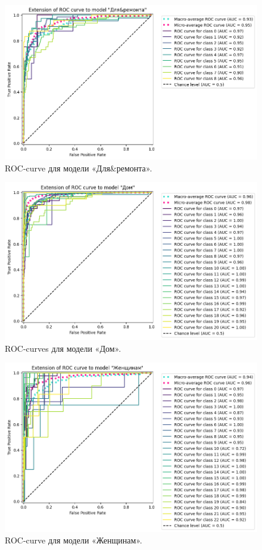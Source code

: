 \documentclass[a4paper,12pt]{extarticle}
\begin{document}
\begin{figure}[hbtp]
	\centering
	\includegraphics[scale=0.7]{roc_curves/roccurve_Для&ремонта.png}
	\caption{ROC-curve для модели «Для\&ремонта».}
	\label{fig:roccurve_Для&ремонта}
\end{figure}

\begin{figure}[hbtp]
	\centering
	\includegraphics[scale=0.7]{roc_curves/roccurve_Дом.png}
	\caption{ROC-curves для модели «Дом».}
	\label{fig:roccurve_Дом}
\end{figure}

\begin{figure}[hbtp]
	\centering
	\includegraphics[scale=0.7]{roc_curves/roccurve_Женщинам.png}
	\caption{ROC-curve для модели «Женщинам».}
	\label{fig:roccurve_Женщинам}
\end{figure}
\end{document}
